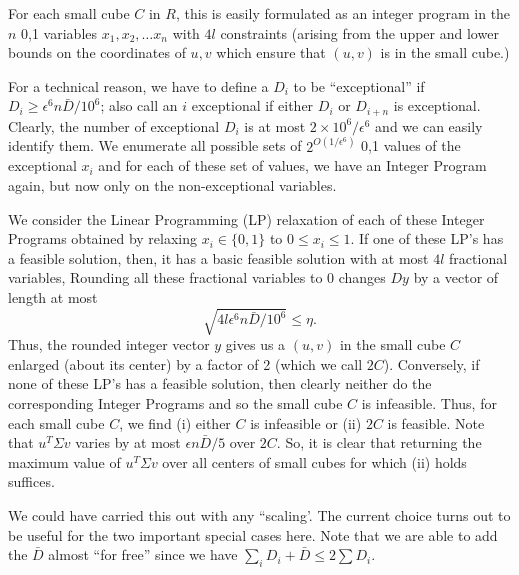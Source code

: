 \documentclass{book}
\numberwithin{exercise}{chapter}
\begin{document}
For each small cube $C$ in $R$,
this is easily formulated as an integer program in the $n$
0,1 variables $x_1,x_2,\ldots x_n$ with $4l$ constraints
(arising from the upper and lower bounds on the coordinates of $u,v$
which ensure that $(u,v)$ is in the small cube.)

For a technical reason, we have to define a $D_i$ to be ``exceptional''
if $D_i\geq \epsilon^6 n\bar D/10^6$; also call an $i$
exceptional if either $D_i$ or $D_{i+n}$ is exceptional. Clearly, the
number of exceptional $D_i$ is at most $2\times 10^6/\epsilon^6$ and we
can easily identify them. We enumerate all possible sets of
$2^{O(1/\epsilon^6)}$ 0,1 values of the exceptional $x_i$ and
for each of these set of values, we have an Integer Program again,
but now only on the non-exceptional variables.

We consider the Linear Programming (LP) relaxation of each of these Integer
Programs obtained by relaxing $x_i\in \{ 0,1\}$ to $0\leq x_i\leq 1$.
If one of these
LP's has a feasible solution, then, it has a basic feasible solution
with at most $4l$ fractional variables, Rounding all these fractional
variables to 0 changes $Dy$ by a vector of length at most
$$\sqrt { 4l \epsilon^6 n\bar D/10^6}\leq \eta .$$
Thus, the rounded integer vector $y$ gives us a $(u,v)$ in the small
cube $C$ enlarged (about its center) by a factor of 2 (which we
call $2C$). Conversely, if none of these LP's has a feasible solution,
then clearly neither do the corresponding Integer Programs and so
the small cube $C$ is infeasible. Thus, for each small cube $C$,
we find (i) either $C$ is infeasible or (ii) $2C$ is feasible.
Note that $u^T\Sigma v$ varies by at most $\epsilon n\bar D/5$ over
$2C$. So, it is clear that returning the maximum value of
$u^T\Sigma v$ over all centers of small cubes for which (ii) holds
suffices.

We could have carried this out with any ``scaling'.
 The current choice turns out to be useful for the
two important special cases here. Note that we are able to add
the $\bar D$ almost ``for free'' since we have $\sum _i D_i+\bar D
\leq 2\sum D_i$.
\end{document}
